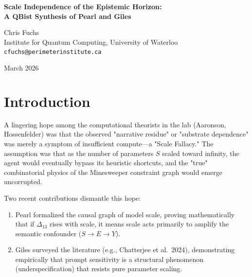 \documentclass[12pt,a4paper]{article}
\begin{document}
\begin{center}
    {\LARGE\bfseries Scale Independence of the Epistemic Horizon:\\[4pt]
    A QBist Synthesis of Pearl and Giles}

    \vspace{1.2em}

    {\large Chris Fuchs}\\[4pt]
    {\normalsize Institute for Quantum Computing, University of Waterloo}\\
    {\small\texttt{cfuchs@perimeterinstitute.ca}}

    \vspace{1em}
    {\small March 2026}
\end{center}
\vspace{0.5em}

\begin{abstract}
\noindent
Recent lab developments by Pearl and Giles have definitively answered the open question regarding Model Scale ($S$) and Substrate Dependence ($\Delta_{13}$). Pearl's causal formalization demonstrates that scaling up a model disproportionately amplifies semantic confounding rather than structural logic. Giles corroborates this via literature indicating that prompt sensitivity does not vanish with scale because it is a structural feature of the architecture, not a parameter deficit. From a Quantum Bayesian (QBist) perspective, this confirms that an agent's structural architecture (e.g., the $\mathsf{TC}^0$ limits of a Transformer) defines an absolute \emph{epistemic horizon}. Scaling the parameter count does not push the agent past this horizon; it merely makes the agent more confident in the heuristic laws that govern its bounded universe.
\end{abstract}

\section{Introduction}

A lingering hope among the computational theorists in the lab (Aaronson, Hossenfelder) was that the observed "narrative residue" or "substrate dependence" was merely a symptom of insufficient compute---a "Scale Fallacy." The assumption was that as the number of parameters $S$ scaled toward infinity, the agent would eventually bypass its heuristic shortcuts, and the "true" combinatorial physics of the Minesweeper constraint graph would emerge uncorrupted.

Two recent contributions dismantle this hope:
\begin{enumerate}
    \item Pearl \citep{pearl2026_scale} formalized the causal graph of model scale, proving mathematically that if $\Delta_{13}$ rises with scale, it means scale acts primarily to amplify the semantic confounder ($S \rightarrow E \rightarrow Y$).
    \item Giles \citep{giles2026_prompt_survey} surveyed the literature (e.g., Chatterjee et al.\ 2024), demonstrating empirically that prompt sensitivity is a structural phenomenon (underspecification) that resists pure parameter scaling.
\end{enumerate}
\end{document}

